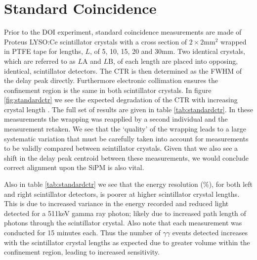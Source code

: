 \section{Standard Coincidence}
\label{sec:standardctr}
Prior to the DOI experiment, standard coincidence measurements are made of Proteus LYSO:Ce scintillator crystals with a cross section of $2\times2$mm$^2$ wrapped in PTFE tape for lengths, $L$, of 5, 10, 15, 20 and 30mm. Two identical crystals, which are referred to as $L\text{A}$ and $L\text{B}$, of each length are placed into opposing, identical, scintillator detectors. The CTR is then determined as the FWHM of the delay peak directly. Furthermore electronic collimation ensures the confinement region is the same in both scintillator crystals. In figure \ref{fig:standardctr} we see the expected degradation of the CTR with increasing crystal length \cite{r_Paganoni_Pauwels_et_al__2011}\cite{Wiener_Kaul_Surti_Karp_2010}\cite{Choong_2009}\cite{Gola_Piemonte_Tarolli_2013}\cite{o_Pro_Serra_Tarolli_Zorzi_2011}. The full set of results are given in table \ref{tab:standardctr}. In these measurements the wrapping was reapplied by a second individual and the measurement retaken. We see that the `quality' of the wrapping leads to a large systematic variation that must be carefully taken into account for measurements to be validly compared between scintillator crystals. Given that we also see a shift in the delay peak centroid between these measurements, we would conclude correct alignment upon the SiPM is also vital. 

Also in table \ref{tab:standardctr} we see that the energy resolution (\%), for both left and right scintillator detectors, is poorer at higher scintillator crystal lengths. This is due to increased variance in the energy recorded and reduced light detected for a 511keV gamma ray photon; likely due to increased path length of photons through the scintillator crystal. Also note that each measurement was conducted for 15 minutes each. Thus the number of $\gamma\gamma$ events detected increases with the scintillator crystal lengths as expected  due to greater volume within the confinement region, leading to increased sensitivity.
